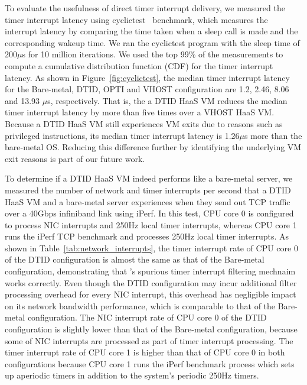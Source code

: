 To evaluate the usefulness of direct timer interrupt delivery, we 
measured the timer interrupt latency using cyclictest~\cite{cyclictest} benchmark, which 
measures the interrupt latency by comparing the time taken when a sleep 
call is made and the corresponding wakeup time. 
We ran the cyclictest program with the sleep time of 200$\mu$s for 10 million
iterations. 
We used the top 99\% of the measurements to compute a cumulative distribution function (CDF)
for the timer interrupt latency. As shown in Figure~\ref{fig:cyclictest}, the 
median timer interrupt latency for the Bare-metal, DTID, OPTI and
VHOST configuration are 1.2, 2.46, 8.06 and 13.93 $\mu$s, respectively.
That is, the a DTID HaaS VM reduces the median timer interrupt latency by
more than five times over a VHOST HaaS VM.
Because a DTID HaaS VM still experiences VM exits due to reasons such as privileged instructions,
its median timer interrupt latency is 1.26$\mu$s more than the bare-metal OS. 
Reducing this difference further by identifying the underlying VM exit reasons 
is part of our future work.


To determine if a DTID HaaS VM indeed performs like a bare-metal server,
we measured the number of network and timer interrupts per second that a DTID HaaS VM and a bare-metal server
experiences when they send out TCP traffic over a 40Gbps infiniband link using iPerf.
In this test, CPU core 0 is configured to process NIC interrupts and 250Hz local timer interrupts, whereas CPU core 1 runs the 
iPerf TCP benchmark and processes 250Hz local timer interrupts.
As shown in Table~\ref{tab:network_interrupts},
the timer interrupt rate of CPU core 0 of the DTID configuration is almost the same as that of the Bare-metal configuration, 
demonstrating that \sna's spurious timer interrupt filtering mechnaim works correctly. 
Even though the DTID configuration may incur additional filter processing overhead for every NIC interrupt,
this overhead has negligible impact on its network bandwidth performance, which is comparable to that of the Bare-metal 
configuration.   
The NIC interrupt rate of CPU core 0 of the DTID configuration is slightly lower than that of the Bare-metal configuration, 
because some of NIC interrupts are processed as part of timer interrupt processing.
The timer interrupt rate of CPU core 1 is higher than that of CPU core 0 in both configurations because CPU core 1 runs
the iPerf benchmark process which sets up aperiodic timers in addition to the system's periodic 250Hz timers. 




